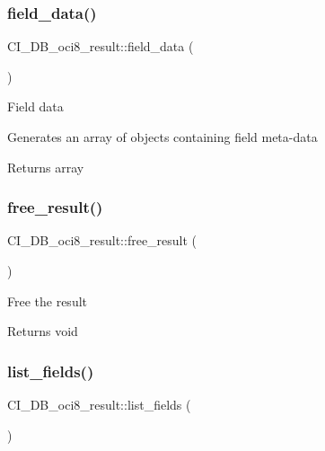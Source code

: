 \subsubsection{\texorpdfstring{field\+\_\+data()}{field\_data()}}
{\footnotesize\ttfamily C\+I\+\_\+\+D\+B\+\_\+oci8\+\_\+result\+::field\+\_\+data (\begin{DoxyParamCaption}{ }\end{DoxyParamCaption})}

Field data

Generates an array of objects containing field meta-\/data

\begin{DoxyReturn}{Returns}
array 
\end{DoxyReturn}
\mbox{\label{class_c_i___d_b__oci8__result_abfb8b717055f73b37d7a7ed80f862284}} 
\subsubsection{\texorpdfstring{free\+\_\+result()}{free\_result()}}
{\footnotesize\ttfamily C\+I\+\_\+\+D\+B\+\_\+oci8\+\_\+result\+::free\+\_\+result (\begin{DoxyParamCaption}{ }\end{DoxyParamCaption})}

Free the result

\begin{DoxyReturn}{Returns}
void 
\end{DoxyReturn}
\mbox{\label{class_c_i___d_b__oci8__result_a28131c06b8fd94b72835395ce225c37a}} 
\subsubsection{\texorpdfstring{list\+\_\+fields()}{list\_fields()}}
{\footnotesize\ttfamily C\+I\+\_\+\+D\+B\+\_\+oci8\+\_\+result\+::list\+\_\+fields (\begin{DoxyParamCaption}{ }\end{DoxyParamCaption})}

